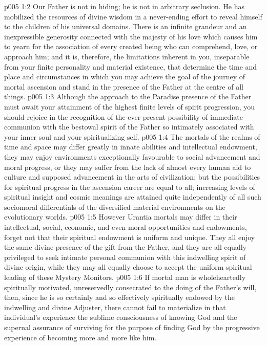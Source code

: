 \vs p005 1:2 Our Father is not in hiding; he is not in arbitrary seclusion. He has mobilized the resources of divine wisdom in a never\hyp{}ending effort to reveal himself to the children of his universal domains. There is an infinite grandeur and an inexpressible generosity connected with the majesty of his love which causes him to yearn for the association of every created being who can comprehend, love, or approach him; and it is, therefore, the limitations inherent in you, inseparable from your finite personality and material existence, that determine the time and place and circumstances in which you may achieve the goal of the journey of mortal ascension and stand in the presence of the Father at the centre of all things.
\vs p005 1:3 \pc Although the approach to the Paradise presence of the Father must await your attainment of the highest finite levels of spirit progression, you should rejoice in the recognition of the ever\hyp{}present possibility of immediate communion with the bestowal spirit of the Father so intimately associated with your inner soul and your spiritualizing self.
\vs p005 1:4 The mortals of the realms of time and space may differ greatly in innate abilities and intellectual endowment, they may enjoy environments exceptionally favourable to social advancement and moral progress, or they may suffer from the lack of almost every human aid to culture and supposed advancement in the arts of civilization; but the possibilities for spiritual progress in the ascension career are equal to all; increasing levels of spiritual insight and cosmic meanings are attained quite independently of all such sociomoral differentials of the diversified material environments on the evolutionary worlds.
\vs p005 1:5 However Urantia mortals may differ in their intellectual, social, economic, and even moral opportunities and endowments, forget not that their spiritual endowment is uniform and unique. They all enjoy the same divine presence of the gift from the Father, and they are all equally privileged to seek intimate personal communion with this indwelling spirit of divine origin, while they may all equally choose to accept the uniform spiritual leading of these Mystery Monitors.
\vs p005 1:6 \pc If mortal man is wholeheartedly spiritually motivated, unreservedly consecrated to the doing of the Father’s will, then, since he is so certainly and so effectively spiritually endowed by the indwelling and divine Adjuster, there cannot fail to materialize in that individual’s experience the sublime consciousness of knowing God and the supernal assurance of surviving for the purpose of finding God by the progressive experience of becoming more and more like him.
